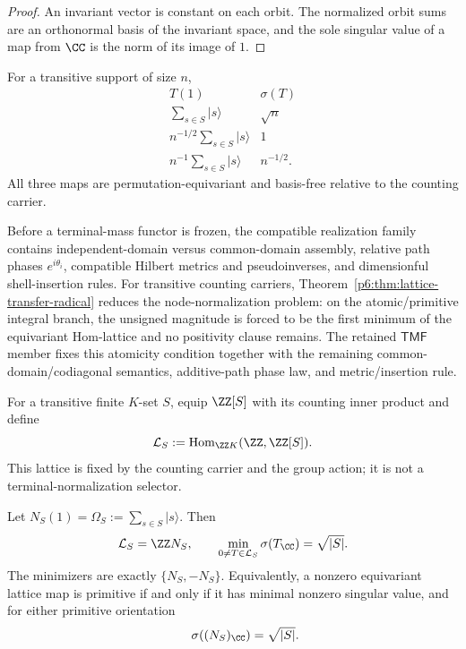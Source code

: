 \documentclass[12pt,a4paper]{article}
\begin{document}
\begin{proof}
An invariant vector is constant on each orbit.  The normalized orbit sums
are an orthonormal basis of the invariant space, and the sole singular value
of a map from \(\CC\) is the norm of its image of \(1\).
\end{proof}

\begin{corollary}
\label{p6:cor:terminal-normalizations}
For a transitive support of size \(n\),
\[
\begin{array}{c|c}
T(1)&\sigma(T)\\
\hline
\sum_{s\in S}|s\rangle&\sqrt n\\
n^{-1/2}\sum_{s\in S}|s\rangle&1\\
n^{-1}\sum_{s\in S}|s\rangle&n^{-1/2}.
\end{array}
\]
All three maps are permutation-equivariant and basis-free relative to the
counting carrier.
\end{corollary}

\begin{definition}
\label{p6:def:tmf-realization-family}
Before a terminal-mass functor is frozen, the compatible realization family
contains independent-domain versus common-domain assembly, relative path
phases \(e^{i\theta_i}\), compatible Hilbert metrics and pseudoinverses, and
dimensionful shell-insertion rules.  For transitive counting carriers,
Theorem~\ref{p6:thm:lattice-transfer-radical} reduces the node-normalization
problem: on the atomic/primitive integral branch, the unsigned magnitude is
forced to be the first minimum of the equivariant Hom-lattice and no positivity
clause remains.  The retained \(\mathsf{TMF}\) member fixes this atomicity
condition together with the remaining common-domain/codiagonal semantics,
additive-path phase law, and metric/insertion rule.
\end{definition}

\begin{definition}
\label{p6:def:primitive-lattice-transfer}
For a transitive finite \(K\)-set \(S\), equip \(\ZZ[S]\) with its counting
inner product and define
\[
\mathcal L_S
:=
\operatorname{Hom}_{\ZZ K}(\ZZ,\ZZ[S]).
\]
This lattice is fixed by the counting carrier and the group action; it is not
a terminal-normalization selector.
\end{definition}

\begin{theorem}
\label{p6:thm:lattice-transfer-radical}
Let \(N_S(1)=\Omega_S:=\sum_{s\in S}|s\rangle\).  Then
\[
\mathcal L_S=\ZZ N_S,
\qquad
\min_{0\ne T\in\mathcal L_S}\sigma(T_\CC)=\sqrt{|S|}.
\]
The minimizers are exactly \(\{N_S,-N_S\}\).  Equivalently, a nonzero
equivariant lattice map is primitive if and only if it has minimal nonzero
singular value, and for either primitive orientation
\[
\qquad
\sigma((N_S)_\CC)=\sqrt{|S|}.
\]
\end{theorem}
\end{document}
